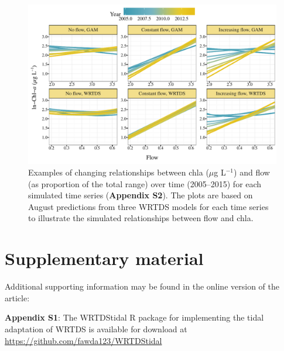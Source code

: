 \documentclass{svjour3}\usepackage[]{graphicx}\usepackage[]{color}
\makeatletter
\def\maxwidth{ %
  \ifdim\Gin@nat@width>\linewidth
    \linewidth
  \else
    \Gin@nat@width
  \fi
}
\newcommand{\mugl}{$\mu$g L$^{-1}$}
\newcommand{\beginsupplement}{%
        \setcounter{table}{0}
        \renewcommand{\thetable}{S\arabic{table}}%
        \setcounter{figure}{0}
        \renewcommand{\thefigure}{S\arabic{figure}}%
     }
\makeatother
\begin{document}
\begin{figure}[!ht]

{\centering \includegraphics[width=\maxwidth]{figs/dynasim-1} 

}

\caption{Examples of changing relationships between \ac{chla} (\mugl) and flow (as proportion of the total range) over time (2005--2015) for each simulated time series ({\bf Appendix S2}).  The plots are based on August predictions from three \ac{WRTDS} models for each time series to illustrate the simulated relationships between flow and \ac{chla}.}\label{fig:dynasim}
\end{figure}



\clearpage
\section{Supplementary material}

\beginsupplement

Additional supporting information may be found in the online version of the article:

{\bf Appendix S1}: The WRTDStidal R package for implementing the tidal adaptation of \ac{WRTDS} is available for download at \href{https://github.com/fawda123/WRTDStidal}{https://github.com/fawda123/WRTDStidal}
\end{document}
